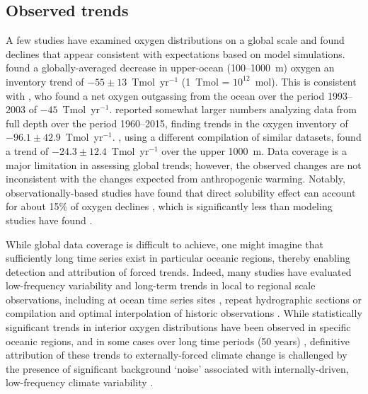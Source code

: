 \documentclass[draft,linenumbers]{report_chapter}
\begin{document}
\subsection{Observed trends}\label{loc:obs-tr}

A few studies have examined oxygen distributions on a global scale and found declines that appear consistent with expectations based on model simulations.
\citet{Helm-Bindoff-etal-2011} found a globally-averaged decrease in upper-ocean (100--1000~m) oxygen an inventory trend of $-55 \pm 13$~Tmol~yr$^{-1}$ (1~Tmol = $10^{12}$~mol).
This is consistent with \citet{Manning-Keeling-2006}, who found a net oxygen outgassing from the ocean over the period  1993--2003 of $-45$~Tmol~yr$^{-1}$.
\citet{Schmidtko-Stramma-etal-2017} reported somewhat larger numbers analyzing data from full depth over the period 1960--2015, finding trends in the oxygen inventory of $-96.1\pm42.9$~Tmol~yr$^{-1}$.
\citet{Ito-Minobe-etal-2017}, using a different compilation of similar datasets, found a trend of $-24.3\pm12.4$~Tmol~yr$^{-1}$ over the upper 1000~m.
Data coverage is a major limitation in assessing global trends; however, the observed changes are not inconsistent with the changes expected from anthropogenic warming.
Notably, observationally-based studies have found that direct solubility effect can account for about 15\% of oxygen declines \citep{Helm-Bindoff-etal-2011,Schmidtko-Stramma-etal-2017}, which is significantly less than modeling studies have found \citep[e.g.,][]{Bopp-Quere-etal-2002}.

While global data coverage is difficult to achieve, one might imagine that sufficiently long time series exist in particular oceanic regions, thereby enabling detection and attribution of forced trends.
Indeed, many studies have evaluated low-frequency variability and long-term trends in local to regional scale  observations, including at ocean time series sites \citep[e.g.,][]{Ono-Midorikawa-etal-2001,Andreev-Baturina-2006,Whitney-Freeland-etal-2007,McClatchie-Goericke-etal-2010}, repeat hydrographic sections \citep[e.g.,][]{Emerson-Watanabe-etal-2004,Johnson-Gruber-2007,Mecking-Langdon-etal-2008,van-Aken-Femke-de-Jong-etal-2011,Sasano-Takatani-etal-2015} or compilation and optimal interpolation of historic observations \citep[e.g.,][]{Stramma-Johnson-etal-2008,Helm-Bindoff-etal-2011,Stendardo-Gruber-2012}.
While statistically significant trends in interior oxygen distributions have been observed in specific oceanic regions, and in some cases over long time periods (50 years) \citep{Stendardo-Gruber-2012}, definitive attribution of these trends to externally-forced climate change is challenged by the presence of significant background `noise' associated with internally-driven, low-frequency climate variability \citep{Garcia-Boyer-etal-2005,Ito-Deutsch-2010}.
\end{document}
